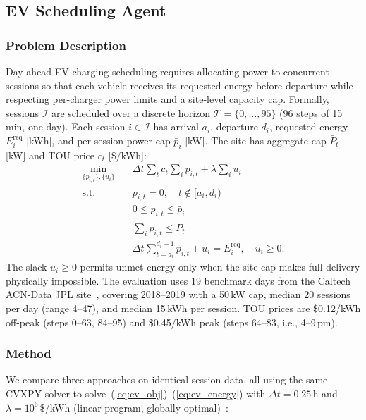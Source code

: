 \subsection{EV Scheduling Agent}

\subsubsection*{\textbf{Problem Description}}
Day-ahead EV charging scheduling requires allocating power to concurrent sessions so that each vehicle receives its requested energy before departure while respecting per-charger power limits and a site-level capacity cap. Formally, sessions $\mathcal{I}$ are scheduled over a discrete horizon $\mathcal{T} = \{0,\ldots,95\}$ (96 steps of 15\,min, one day). Each session $i \in \mathcal{I}$ has arrival $a_i$, departure $d_i$, requested energy $E_i^{\mathrm{req}}$ [kWh], and per-session power cap $\bar{p}_i$ [kW]. The site has aggregate cap $\bar{P}_t$ [kW] and TOU price $c_t$ [\$/kWh]:
\begin{align}
\min_{\{p_{i,t}\},\{u_i\}} \quad &
    \Delta t \sum_t c_t \sum_i p_{i,t}
    + \lambda \sum_i u_i \label{eq:ev_obj}\\
\text{s.t.}\quad
& p_{i,t} = 0, \quad t \notin [a_i, d_i) \label{eq:ev_avail}\\
& 0 \le p_{i,t} \le \bar{p}_i \label{eq:ev_power}\\
& \textstyle\sum_i p_{i,t} \le \bar{P}_t \label{eq:ev_cap}\\
& \Delta t \textstyle\sum_{t=a_i}^{d_i-1} p_{i,t} + u_i
    = E_i^{\mathrm{req}}, \quad u_i \ge 0. \label{eq:ev_energy}
\end{align}
The slack $u_i \ge 0$ permits unmet energy only when the site cap makes full delivery physically impossible.
The evaluation uses 19 benchmark days from the Caltech ACN-Data JPL site~\cite{lee2019acndata}, covering 2018--2019 with a 50\,kW cap, median 20 sessions per day (range 4--47), and median 15\,kWh per session. TOU prices are \$0.12/kWh off-peak (steps 0--63, 84--95) and \$0.45/kWh peak (steps 64--83, i.e., 4--9\,pm).

\subsubsection*{\textbf{Method}}

We compare three approaches on identical session data, all using the same CVXPY solver to solve~(\ref{eq:ev_obj})--(\ref{eq:ev_energy}) with $\Delta t = 0.25$\,h and $\lambda = 10^6$\,\$/kWh (linear program, globally optimal)~\cite{diamond2016cvxpy}:

